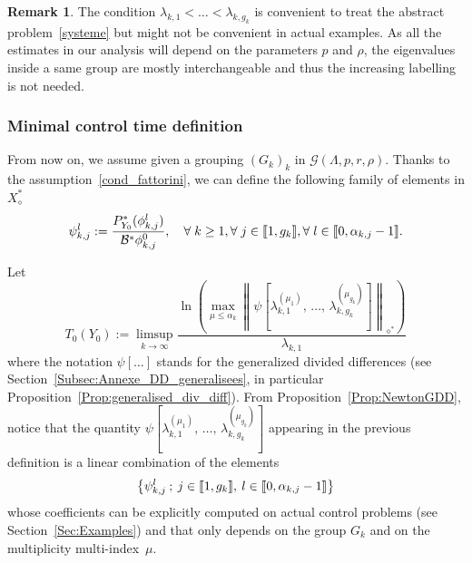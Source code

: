 \documentclass[11pt]{article}
\theoremstyle{definition}
\newtheorem{rema}[theo]{Remark}
\numberwithin{equation}{section}
\numberwithin{figure}{section}
\numberwithin{table}{section}
\newcommand{\llbracket}{\mathopen{[\mkern -2.7mu[}}
\newcommand{\rrbracket}{\mathclose{]\mkern -2.7mu]}}
\newcommand{\inter}[2]{\llbracket #1,#2 \rrbracket}
\newcommand\Bs{\mathcal{B}^*}
\newcommand{\Xalphas}{X_\diamond^*}
\newcommand{\Fzp}{Y_0}
\newcommand{\normeF}[1]{\left\| #1 \right\|_{\diamond^*}}
\newcommand{\PFa}{P_{\Fzp}^*}
\newcommand{\n}{g}
\let\oldforall\forall
\renewcommand*{\forall}{\mathrel{\oldforall}}
\begin{document}
\begin{rema}
The condition $\lambda_{k,1} < \dots < \lambda_{k,g_k}$ is convenient to treat the abstract problem~\eqref{systeme} but might not be convenient in actual examples. As all the estimates in our analysis will depend on the parameters $p$ and $\rho$, the eigenvalues inside a same group are mostly interchangeable and thus the increasing labelling is not needed.
\end{rema}


\subsubsection{Minimal control time definition}

From now on, we assume given a grouping $(G_k)_k$ in $\mathcal{G}(\Lambda,p,r,\rho)$. Thanks to the assumption~\eqref{cond_fattorini}, we can define the following family of elements in $\Xalphas$
\begin{equation}\label{Def_Psik}
\psi_{k,j}^l := \frac{\PFa(\phi_{k,j}^l)}{\Bs \phi_{k,j}^0}, \quad \forall k\geq 1, \forall j\in \inter{1}{\n_k}, \forall l \in \inter{0}{\alpha_{k,j}-1}.
\end{equation}



Let
\begin{equation}\label{Def:T0_DDgeneralisees}
T_0(\Fzp) := \limsup_{k\to \infty} \frac{\ln \left(\max \limits_{\mu\leq \alpha_k} \normeF{\psi\left[\lambda_{k,1}^{(\mu_1)},\,\dotsc,\,\lambda_{k,\n_k}^{(\mu_{\n_k})}\right] } \right)}{\lambda_{k,1}}
\end{equation}
where the notation $\psi[\dotsc]$ stands for the generalized divided differences (see Section~\ref{Subsec:Annexe_DD_generalisees}, in particular Proposition~\ref{Prop:generalised_div_diff}). From Proposition~\ref{Prop:NewtonGDD}, notice that the quantity $\psi[\lambda_{k,1}^{(\mu_1)},\,\dotsc,\,\lambda_{k,\n_k}^{(\mu_{\n_k})}]$ appearing in the previous definition is a linear combination of the elements
\[
\left\{ \psi_{k,j}^l \: ; \: j \in \inter{1}{\n_k}, \: l \in \inter{0}{\alpha_{k,j}-1} \right\}
\]
whose coefficients can be explicitly computed on actual control problems (see Section~\ref{Sec:Examples}) and that only depends on the group $G_k$ and on the multiplicity multi-index~$\mu$.
\end{document}

